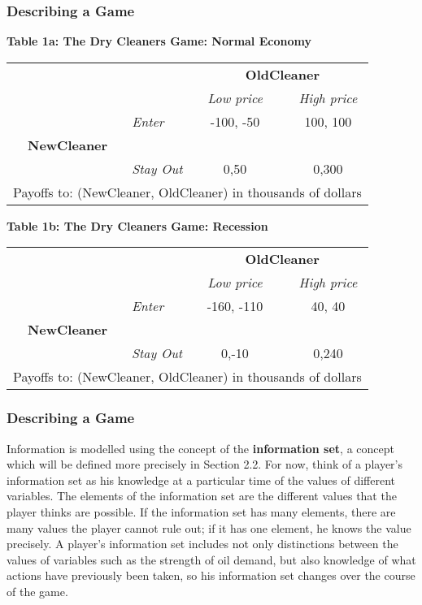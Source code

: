  \begin{frame}[fragile]\frametitle{Describing a Game}
 \begin{center} {\bf Table 1a:  The Dry Cleaners Game: Normal Economy}

 \begin{tabular}{lllccc} &       &             &\multicolumn{3}{c}{\bf
OldCleaner}\\ &       &             &   {\it Low price}  &   & {\it High price}
\\ &   &  {\it Enter}      &     -100, -50 &    &100, 100 \\ & {\bf NewCleaner}
&& & &   \\ &  &       {\it   Stay Out}     &      0,50   &    &  0,300  \\
\multicolumn{6}{l}{ Payoffs to: (NewCleaner, OldCleaner) in thousands of dollars
} \end{tabular} \end{center}

  \begin{center} {\bf Table 1b:  The Dry Cleaners Game: Recession}

 \begin{tabular}{lllccc} &       &             &\multicolumn{3}{c}{\bf
OldCleaner}\\ &       &             &   {\it Low price}  &   & {\it High price}
\\ &   &  {\it Enter}      &     -160, -110 &    &40, 40 \\ & {\bf NewCleaner}
&& & &   \\ &  &       {\it   Stay Out}     &      0,-10   &    &  0,240  \\
\multicolumn{6}{l}{ Payoffs to: (NewCleaner, OldCleaner) in thousands of dollars
} \end{tabular} \end{center}
\end{frame}

 \begin{frame}[fragile]\frametitle{Describing a Game}
  Information is modelled using the concept of the {\bf information set}, a
concept which will be defined more precisely in Section 2.2. For now, think of a
player's information set as his knowledge at a particular time of the values of
different variables. The elements of the information set are the different
values that the player thinks are possible. If the information set has many
elements, there are many values the player cannot rule out; if it has one
element, he knows the value precisely.  A player's information set includes not
only distinctions between the values of variables such as the strength of oil
demand, but also knowledge of what actions have previously been taken, so his
information set changes over the course of the game.
\end{frame}

